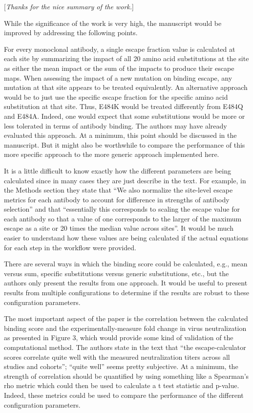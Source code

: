 \documentclass[11pt, oneside]{article}   	%
\newcommand{\comment}[1]{{\color{red}[\textsl{#1}]}}
\begin{document}
\comment{Thanks for the nice summary of the work.}

While the significance of the work is very high, the manuscript would be improved by addressing the following points.

For every monoclonal antibody, a single escape fraction value is calculated at each site by summarizing the impact of all 20 amino acid substitutions at the site as either the mean impact or the sum of the impacts to produce their escape maps.  When assessing the impact of a new mutation on binding escape, any mutation at that site appears to be treated equivalently.  An alternative approach would be to just use the specific escape fraction for the specific amino acid substitution at that site.  Thus, E484K would be treated differently from E484Q and E484A.  Indeed, one would expect that some substitutions would be more or less tolerated in terms of antibody binding.  The authors may have already evaluated this approach.  At a minimum, this point should be discussed in the manuscript.  But it might also be worthwhile to compare the performance of this more specific approach to the more generic approach implemented here.

It is a little difficult to know exactly how the different parameters are being calculated since in many cases they are just describe in the text.  For example, in the Methods section they state that “We also normalize the site-level escape metrics for each antibody to account for difference in strengths of antibody selection” and that “essentially this corresponds to scaling the escape value for each antibody so that a value of one corresponds to the larger of the maximum escape as a site or 20 times the median value across sites”.  It would be much easier to understand how these values are being calculated if the actual equations for each step in the workflow were provided.

There are several ways in which the binding score could be calculated, e.g., mean versus sum, specific substitutions versus generic substitutions, etc., but the authors only present the results from one approach.  It would be useful to present results from multiple configurations to determine if the results are robust to these configuration parameters.

The most important aspect of the paper is the correlation between the calculated binding score and the experimentally-measure fold change in virus neutralization as presented in Figure 3, which would provide some kind of validation of the computational method.  The authors state in the text that “the escape-calculator scores correlate quite well with the measured neutralization titers across all studies and cohorts”; “quite well” seems pretty subjective.  At a minimum, the strength of correlation should be quantified by using something like a Spearman’s rho metric which could then be used to calculate a t test statistic and p-value.  Indeed, these metrics could be used to compare the performance of the different configuration parameters.
\end{document}
